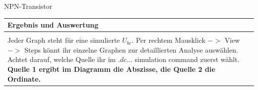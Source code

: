 \begin{frame}[t]{NPN-Transistor}
  \begin{spacing}{0.9} \begin{tiny}
      \begin{table}[h!]
        \begin{tabular}{p{10cm} }
          \hline
          \textbf{Ergebnis und Auswertung} \\
          \hline                           \\
          Jeder Graph steht für eine simulierte $U_{be}$. Per rechtem Mausklick $->$ View $->$ Steps könnt ihr einzelne Graphen zur
          detaillierten Analyse auswählen. \newline\newline Achtet darauf, welche Quelle ihr im $.dc ...$ simulation command zuerst wählt. \textbf{Quelle 1 ergibt im Diagramm die Abszisse, die Quelle 2 die Ordinate.}
        \end{tabular}
      \end{table}
    \end{tiny} \end{spacing}

\end{frame}